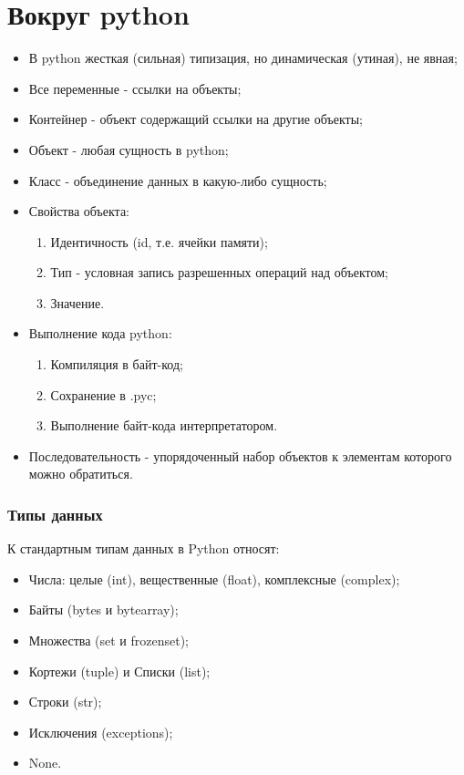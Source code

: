 \part{Вокруг python}

\begin{itemize}
    \item В python жесткая (сильная) типизация, но динамическая (утиная), не явная;
    \item Все переменные - ссылки на объекты;
    \item Контейнер - объект содержащий ссылки на другие объекты;
    \item Объект - любая сущность в python;
    \item Класс - объединение данных в какую-либо сущность;
    \item Свойства объекта:
    \begin{enumerate}
        \item Идентичность (id, т.е. \No ячейки памяти);
        \item Тип - условная запись разрешенных операций над объектом;
        \item Значение.
    \end{enumerate}
    \item Выполнение кода python:
    \begin{enumerate}
        \item Компиляция в байт-код;
        \item Сохранение в .pyc;
        \item Выполнение байт-кода интерпретатором.
    \end{enumerate}
    \item Последовательность - упорядоченный набор объектов к элементам которого можно обратиться.
\end{itemize}

\section{Типы данных}

	К стандартным типам данных в Python относят:
	\begin{itemize}
		\item Числа: целые (int), вещественные (float), комплексные (complex);
		\item Байты (bytes и bytearray);
		\item Множества (set и frozenset);
		\item Кортежи (tuple) и Списки (list);
		\item Строки (str);
		\item Исключения (exceptions);
		\item None.
	\end{itemize}
	
